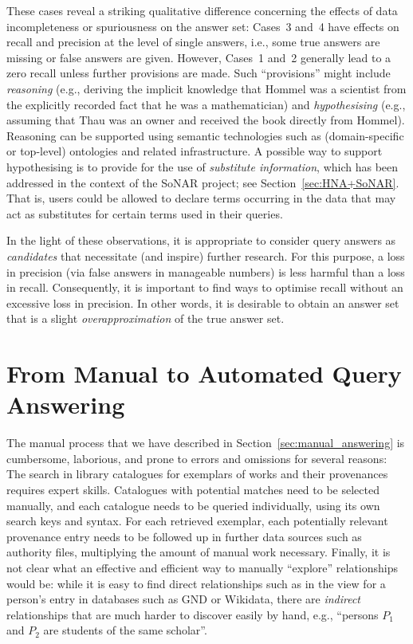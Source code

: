 %
These cases reveal a striking qualitative difference concerning the effects of data incompleteness or spuriousness
on the answer set: Cases~3 and~4 have effects on recall and precision at the level of single answers,
i.e., some true answers are missing or false answers are given.
However, Cases~1 and~2 generally lead to a zero recall unless further provisions are made.
Such \enquote{provisions} might include \emph{reasoning}
(e.g., deriving the implicit knowledge that \foreignlanguage{ngerman}{Hommel} was a scientist from the explicitly recorded fact that he was a mathematician)
and \emph{hypothesising} (e.g., assuming that \foreignlanguage{ngerman}{Thau} was an owner and received the book directly from \foreignlanguage{ngerman}{Hommel}).
Reasoning can be supported using semantic technologies such as (domain-specific or top-level) ontologies and related infrastructure.
A possible way to support hypothesising is to provide for the use of \emph{substitute information},
which has been addressed in the context of the \gls{SoNAR} project; see Section~\ref{sec:HNA+SoNAR}.
That is, users could be allowed to declare terms occurring in the data that may act as substitutes for certain terms used in their queries.

In the light of these observations,
it is appropriate to consider
query answers as \emph{candidates} that necessitate (and inspire) further research.
For this purpose, a loss in precision (via false answers in manageable numbers) 
is less harmful than a loss in recall.
Consequently, it is important to find ways to optimise recall without an excessive loss in precision.
In other words, it is desirable to obtain an answer set that is a slight \emph{overapproximation}
of the true answer set.

\section{From Manual to Automated Query Answering}
\label{sec:manual_vs_automated}

The manual process that we have described in Section~\ref{sec:manual_answering}
is cumbersome, laborious, and prone to errors and omissions for several reasons:
The search in library catalogues for exemplars of works and their provenances requires expert skills.
Catalogues with potential matches need to be selected manually,
and each catalogue needs to be queried individually, using its own search keys and syntax. 
For each retrieved exemplar, each potentially relevant provenance entry 
needs to be followed up in further data sources such as authority files,
multiplying the amount of manual work necessary.
Finally, it is not clear what an effective and efficient way to manually \enquote{explore}
relationships would be:
while it is easy to find direct relationships such as  in the view for a person's entry
in databases such as \gls{GND} or Wikidata, there are \emph{indirect} relationships
that are much harder to discover easily by hand,
e.g., \enquote{persons $P_1$ and $P_2$ are students of the same scholar}.

